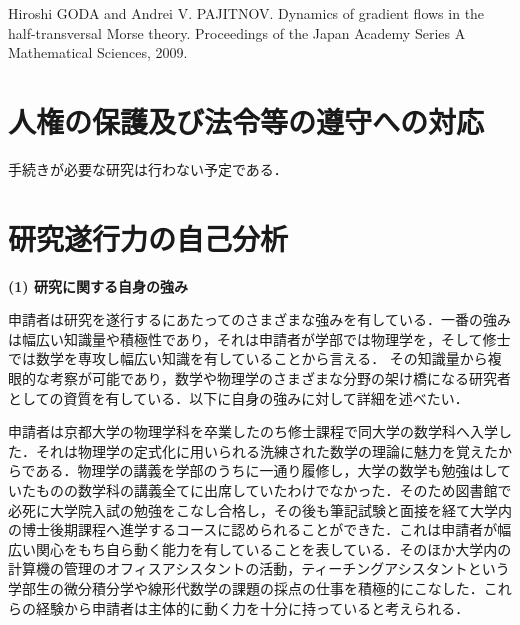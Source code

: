 \documentclass[11pt,a4j,dvipdfmx]{jarticle} 					%
\newcommand{\研究課題名}{象の卵}
\newcommand{\研究機関名}{京都大学}
\newcommand{\研究代表者氏名}{福士謙二}
\begin{document}
\noindent
[4] Hiroshi GODA and Andrei V. PAJITNOV. Dynamics of gradient flows in the half-transversal Morse theory. Proceedings of the Japan Academy Series A Mathematical Sciences, 2009.





\section{人権の保護及び法令等の遵守への対応}

手続きが必要な研究は行わない予定である．





\section{研究遂行力の自己分析}


\noindent
\textbf{(1) 研究に関する自身の強み}

申請者は研究を遂行するにあたってのさまざまな強みを有している．一番の強みは幅広い知識量や積極性であり，それは申請者が学部では物理学を，そして修士では数学を専攻し幅広い知識を有していることから言える．
その知識量から複眼的な考察が可能であり，数学や物理学のさまざまな分野の架け橋になる研究者としての資質を有している．以下に自身の強みに対して詳細を述べたい．



\noindent
{}

申請者は京都大学の物理学科を卒業したのち修士課程で同大学の数学科へ入学した．それは物理学の定式化に用いられる洗練された数学の理論に魅力を覚えたからである．物理学の講義を学部のうちに一通り履修し，大学の数学も勉強はしていたものの数学科の講義全てに出席していたわけでなかった．そのため図書館で必死に大学院入試の勉強をこなし合格し，その後も筆記試験と面接を経て大学内の博士後期課程へ進学するコースに認められることができた．これは申請者が幅広い関心をもち自ら動く能力を有していることを表している．そのほか大学内の計算機の管理のオフィスアシスタントの活動，ティーチングアシスタントという学部生の微分積分学や線形代数学の課題の採点の仕事を積極的にこなした．これらの経験から申請者は主体的に動く力を十分に持っていると考えられる．
\end{document}
